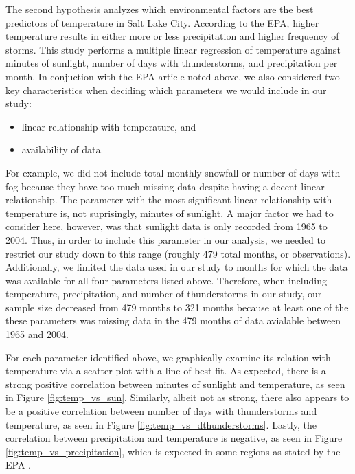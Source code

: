 The second hypothesis analyzes which environmental factors are the best predictors of temperature in Salt Lake City. According to the EPA, higher temperature results in either more or less precipitation and higher frequency of storms\cite{epa_utah}. This study performs a multiple linear regression of temperature against minutes of sunlight, number of days with thunderstorms, and precipitation per month. In conjuction with the EPA article noted above, we also considered two key characteristics when deciding which parameters we would include in our study: 

\begin{itemize}
	\item linear relationship with temperature, and
	\item availability of data.
\end{itemize}

For example, we did not include total monthly snowfall or number of days with fog because they have too much missing data despite having a decent linear relationship. The parameter with the most significant linear relationship with temperature is, not suprisingly, minutes of sunlight. A major factor we had to consider here, however, was that sunlight data is only recorded from 1965 to 2004. Thus, in order to include this parameter in our analysis, we needed to restrict our study down to this range (roughly 479 total months, or observations). Additionally, we limited the data used in our study to months for which the data was available for all four parameters listed above. Therefore, when including temperature, precipitation, and number of thunderstorms in our study, our sample size decreased from 479 months to 321 months because at least one of the these parameters was missing data in the 479 months of data avialable between 1965 and 2004.

For each parameter identified above, we graphically examine its relation with temperature via a scatter plot with a line of best fit. As expected, there is a strong positive correlation between minutes of sunlight and temperature, as seen in Figure \ref{fig:temp_vs_sun}. Similarly, albeit not as strong, there also appears to be a positive correlation between number of days with thunderstorms and temperature, as seen in Figure \ref{fig:temp_vs_dthunderstorms}. Lastly, the correlation between precipitation and temperature is negative, as seen in Figure \ref{fig:temp_vs_precipitation}, which is expected in some regions as stated by the EPA \cite{epa_utah}.

